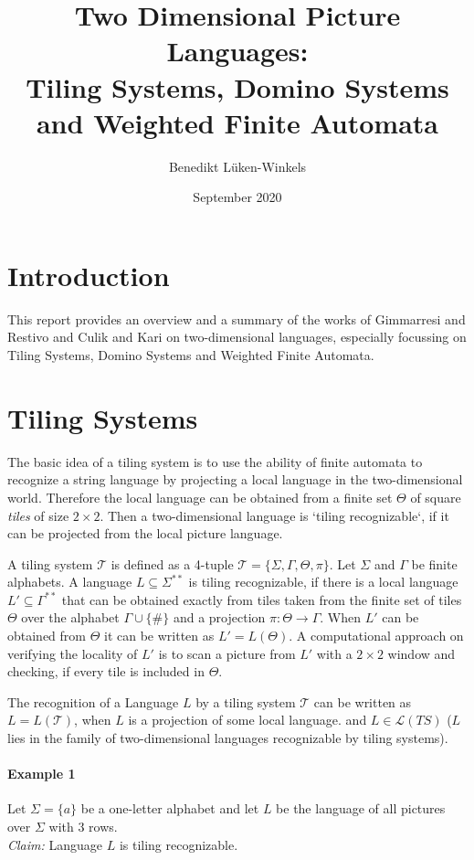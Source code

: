 \documentclass{article}
\title{Two Dimensional Picture Languages: \\ Tiling Systems, Domino Systems and Weighted Finite Automata}
\author{Benedikt Lüken-Winkels }
\date{September 2020}
\begin{document}
\maketitle

\section*{Introduction}
This report provides an overview and a summary of the works of Gimmarresi and Restivo \cite{DBLP:reference/hfl/GiammarresiR97} and Culik and Kari \cite{DBLP:conf/mfcs/CulikK93} on two-dimensional languages, especially focussing on Tiling Systems, Domino Systems and Weighted Finite Automata.






\section{Tiling Systems}
The basic idea of a tiling system is to use the ability of finite automata to recognize a string language by projecting a local language in the two-dimensional world. Therefore the local language can be obtained from a finite set $\Theta$ of square \textit{tiles} of size $2\times2$. Then a two-dimensional language is `tiling recognizable`, if it can be projected from the local picture language.


A tiling system $\mathcal{T}$ is defined as a 4-tuple $\mathcal{T} =\{\Sigma, \Gamma, \Theta, \pi \}$. Let $\Sigma$ and $\Gamma$ be finite alphabets. A language $L \subseteq \Sigma^{**}$ is tiling recognizable, if there is a local language $L' \subseteq \Gamma^{**}$ that can be obtained exactly from tiles taken from the finite set of tiles $\Theta$ over the alphabet $\Gamma \cup \{\#\}$ and a projection $\pi: \Theta \rightarrow \Gamma$. When $L'$ can be obtained from $\Theta$ it can be written as $L' = L(\Theta)$. A computational approach on verifying the locality of $L'$ is to scan a picture from $L'$ with a $2\times2$ window and checking, if every tile is included in $\Theta$.

The recognition of a Language $L$ by a tiling system $\mathcal{T}$ can be written as $L=L(\mathcal{T})$, when $L$ is a projection of some local language. and $L \in \mathcal{L}(TS)$ ($L$ lies in the family of two-dimensional languages recognizable by tiling systems).

\paragraph{Example 1} Let $\Sigma = \{a\}$ be a one-letter alphabet and let $L$ be the language of all pictures over $\Sigma$ with 3 rows. \\ \textit{Claim:} Language $L$ is tiling recognizable.
\end{document}
